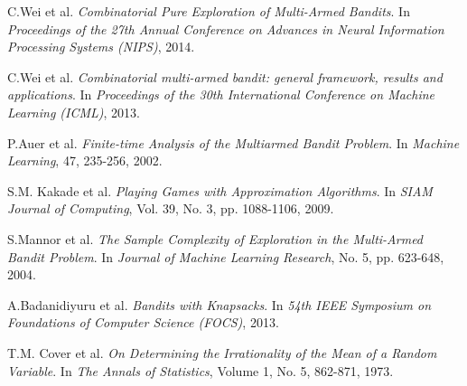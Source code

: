\documentclass[bachelor]{thuthesis}
\begin{document}
\backmatter

\makeatletter
\ifthu@bachelor
  \listofequations
\fi
\makeatother


%
%


\begin{thebibliography}{1}

C.Wei et al. \emph{Combinatorial Pure Exploration of Multi-Armed Bandits}.
In \emph{Proceedings of the 27th Annual Conference on Advances in Neural Information Processing Systems (NIPS)}, 2014.

C.Wei et al. \emph{Combinatorial multi-armed bandit: general framework, results and applications}.
In \emph{Proceedings of the 30th International Conference on Machine Learning (ICML)}, 2013.

P.Auer et al. \emph{Finite-time Analysis of the Multiarmed Bandit Problem}.
In \emph{Machine Learning}, 47, 235-256, 2002.

S.M. Kakade et al. \emph{Playing Games with Approximation Algorithms}.
In \emph{SIAM Journal of  Computing}, Vol. 39, No. 3, pp. 1088-1106, 2009.

S.Mannor et al. \emph{The Sample Complexity of Exploration in the Multi-Armed Bandit Problem}.
In \emph{Journal of Machine Learning Research}, No. 5, pp. 623-648, 2004.

A.Badanidiyuru et al. \emph{Bandits with Knapsacks}.
In \emph{54th IEEE Symposium on Foundations of Computer Science (FOCS)}, 2013.

T.M. Cover et al. \emph{On Determining the Irrationality of the Mean of a Random Variable}.
In \emph{The Annals of Statistics}, Volume 1, No. 5, 862-871, 1973.


\end{thebibliography}


\end{document}
